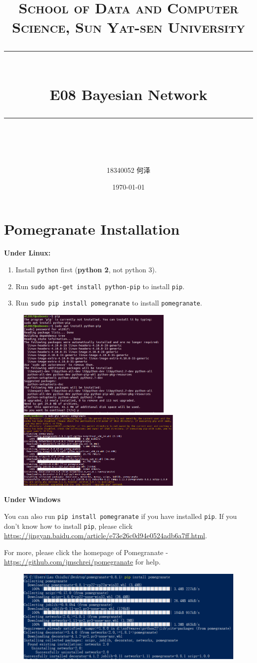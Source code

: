 \documentclass[a4paper, 11pt]{article}
\title{	
\normalfont \normalsize
\textsc{School of Data and Computer Science, Sun Yat-sen University} \\ [25pt] %
\rule{\textwidth}{0.5pt} \\[0.4cm] %
\huge  E08 Bayesian Network\\ %
\rule{\textwidth}{2pt} \\[0.5cm] %
\author{18340052            何泽}
\date{\normalsize\today}
}
\begin{document}
\maketitle
\tableofcontents
\newpage
\section{Pomegranate Installation}
\textbf{Under Linux:}
\begin{enumerate}
\item Install \texttt{python} first (\textbf{python 2}, not python 3).
\item Run \texttt{sudo apt-get install python-pip} to install \texttt{pip}.
\item Run \texttt{sudo pip install pomegranate} to install \texttt{pomegranate}.
\end{enumerate}
\begin{figure}[h]
  \centering
  \includegraphics[width=7.5cm]{Pic/install1}
  \qquad
  \includegraphics[width=8cm]{Pic/install2}
\end{figure}
\textbf{Under Windows}

You can also run \texttt{pip install pomegranate} if you have installed \texttt{pip}. If you don't know how to install \texttt{pip}, please click \url{https://jingyan.baidu.com/article/e73e26c0d94e0524adb6a7ff.html}.

For more, please click the homepage of Pomegranate - \url{https://github.com/jmschrei/pomegranate} for help. 
\begin{figure}[h]

  
  \centering
\includegraphics[width=16cm]{Pic/po}
  
\end{figure}
\end{document}
